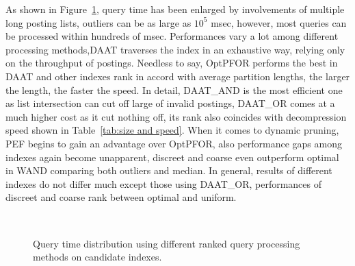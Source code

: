 \documentclass[runningheads,a4paper]{llncs}
\begin{document}
As shown in Figure~\ref{fig:queries}, query time has been enlarged by involvements of multiple long posting lists, outliers can be as large as $10^{5}$ msec, however, most queries can be processed within hundreds of msec.
Performances vary a lot among different processing methods,DAAT traverses the index in an exhaustive way, relying only on the throughput of postings.
Needless to say, OptPFOR performs the best in DAAT and other indexes rank in accord with average partition lengths, the larger the length, the faster the speed.
In detail, DAAT\_AND is the most efficient one as list intersection can cut off large of invalid postings, DAAT\_OR comes at a much higher cost as it cut nothing off, its rank also coincides with decompression speed shown in Table~\ref{tab:size and speed}.
When it comes to dynamic pruning, PEF begins to gain an advantage over OptPFOR, also performance gaps among indexes again become unapparent, discreet and coarse even outperform optimal in WAND comparing both outliers and median.
In general, results of different indexes do not differ much except those using DAAT\_OR, performances of discreet and coarse rank between optimal and uniform.
\begin{figure}
	\centering
	\\
	
	\caption{Query time distribution using different ranked query processing methods on candidate indexes.}
	\label{fig:queries}
\end{figure}
\end{document}
